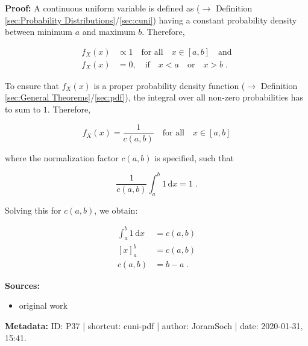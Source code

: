 \documentclass[a4paper,12pt,twoside]{book}
\begin{document}
\vspace{1em}
\textbf{Proof:} A continuous uniform variable is defined as ($\rightarrow$ Definition \ref{sec:Probability Distributions}/\ref{sec:cuni}) having a constant probability density between minimum $a$ and maximum $b$. Therefore,

\begin{equation} \label{eq:cuni-pdf-cuni-pdf-s1}
\begin{split}
f_X(x) &\propto 1 \quad \text{for all} \quad x \in [a,b] \quad \text{and} \\
f_X(x) &= 0, \quad\!\! \text{if} \quad x < a \quad \text{or} \quad x > b \; .
\end{split}
\end{equation}

To ensure that $f_X(x)$ is a proper probability density function ($\rightarrow$ Definition \ref{sec:General Theorems}/\ref{sec:pdf}), the integral over all non-zero probabilities has to sum to $1$. Therefore,

\begin{equation} \label{eq:cuni-pdf-cuni-pdf-s2}
f_X(x) = \frac{1}{c(a,b)} \quad \text{for all} \quad x \in [a,b]
\end{equation}

where the normalization factor $c(a,b)$ is specified, such that

\begin{equation} \label{eq:cuni-pdf-cuni-pdf-s3}
\frac{1}{c(a,b)} \int_{a}^{b} 1 \, \mathrm{d}x = 1 \; .
\end{equation}

Solving this for $c(a,b)$, we obtain:

\begin{equation} \label{eq:cuni-pdf-cuni-pdf-s4}
\begin{split}
\int_{a}^{b} 1 \, \mathrm{d}x &= c(a,b) \\
[x]_a^b &= c(a,b) \\
c(a,b) &= b-a \; .
\end{split}
\end{equation}


\vspace{1em}
\textbf{Sources:}
\begin{itemize}
\item original work\end{itemize}


\vspace{1em}
\textbf{Metadata:} ID: P37 | shortcut: cuni-pdf | author: JoramSoch | date: 2020-01-31, 15:41.
\vspace{1em}
\end{document}
